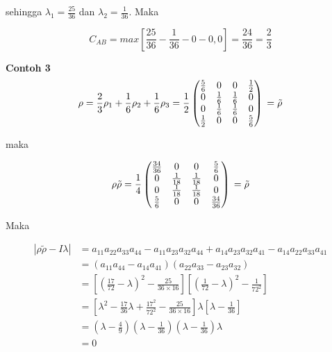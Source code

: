 sehingga $\lambda_1=\frac{25}{36}$ dan $\lambda_2=\frac{1}{36}$. Maka

\begin{equation}
	C_{AB}=max[\frac{25}{36}-\frac{1}{36}-0-0,0]=\frac{24}{36}=\frac{2}{3}
\end{equation}

\textbf{Contoh 3}
\begin{equation}
	\rho = \frac{2}{3}\rho_1 + \frac{1}{6}\rho_2
	+\frac{1}{6}\rho_3\\
	=\frac{1}{2}
	\begin{pmatrix}
		\frac{5}{6}&0&0&\frac{1}{2}\\
		0&\frac{1}{6}&\frac{1}{6}&0\\
		0&\frac{1}{6}&\frac{1}{6}&0\\
		\frac{1}{2}&0&0&\frac{5}{6}
	\end{pmatrix}\\
	=\tilde{\rho}
\end{equation}

maka 

\begin{equation}
	\rho \tilde{\rho} =\frac{1}{4}
	\begin{pmatrix}
		\frac{34}{36}&0&0&\frac{5}{6}\\
		0&\frac{1}{18}&\frac{1}{18}&0\\
		0&\frac{1}{18}&\frac{1}{18}&0\\
		\frac{5}{6}&0&0&\frac{34}{36}
	\end{pmatrix}\\
	=\tilde{\rho}
\end{equation}

Maka

\begin{equation}
	\begin{aligned}
		|\rho \tilde{\rho}-I\lambda|
		&=a_{11}a_{22}a_{33}a_{44}-a_{11}a_{23}a_{32}a_{44}+a_{14}a_{23}a_{32}a_{41}-a_{14}a_{22}a_{33}a_{41}\\
		&=(a_{11}a_{44}-a_{14}a_{41})(a_{22}a_{33}-a_{23}a_{32})\\
		&=[(\frac{17}{72}-\lambda)^2-\frac{25}{36\times16}][(\frac{1}{72}-\lambda)^2-\frac{1}{72^2}]\\
		&=[\lambda^2-\frac{17}{36}\lambda+\frac{17^2}{72^2}-\frac{25}{36\times16}]\lambda[\lambda-\frac{1}{36}]\\
		&=(\lambda-\frac{4}{9})(\lambda-\frac{1}{36})(\lambda-\frac{1}{36})\lambda\\
		&=0
	\end{aligned}
\end{equation}

